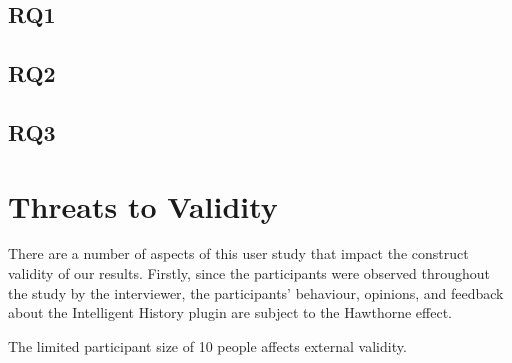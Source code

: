 \subsection{RQ1}

\subsection{RQ2}

\subsection{RQ3}

\section{Threats to Validity}
\label{sec:Threads-to-Validity}

There are a number of aspects of this user study that impact the construct validity of our results.
Firstly, since the participants were observed throughout the study by the interviewer, the participants' behaviour, opinions, and feedback about the Intelligent History plugin are subject to the Hawthorne effect.

The limited participant size of 10 people affects external validity.


\endinput

Any text after an \endinput is ignored.
You could put scraps here or things in progress.